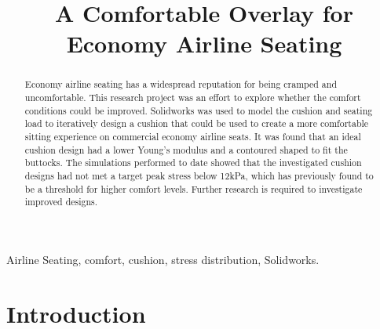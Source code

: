 \documentclass[conference]{IEEEtran}
\begin{document}
%
\title{A Comfortable Overlay for Economy Airline Seating}


\author{
\and
{}
}


\maketitle

\begin{abstract}
Economy airline seating has a widespread reputation for being cramped and uncomfortable. This research project was an effort to explore whether the comfort conditions could be improved. Solidworks was used to model the cushion and seating load to iteratively design a cushion that could be used to create a more comfortable sitting experience on commercial economy airline seats. It was found that an ideal cushion design had a lower Young's modulus and a contoured shaped to fit the buttocks. The simulations performed to date showed that the investigated cushion designs had not met a target peak stress below 12kPa, which has previously found to be a threshold for higher comfort levels. Further research is required to investigate improved designs.
\end{abstract}

\begin{IEEEkeywords}
Airline Seating, comfort, cushion, stress distribution, Solidworks.
\end{IEEEkeywords}

\tableofcontents

\section{Introduction}
\end{document}
